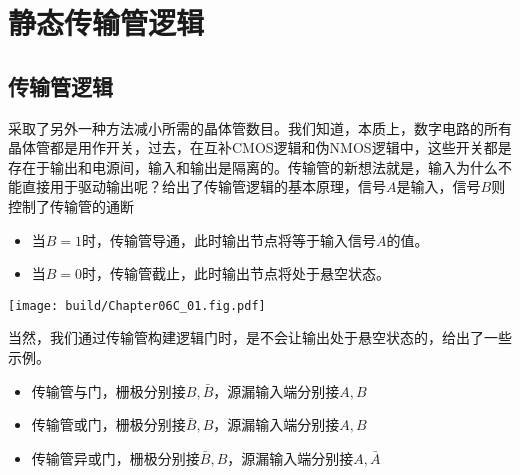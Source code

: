 \section{静态传输管逻辑}

\subsection{传输管逻辑}
采取了另外一种方法减小所需的晶体管数目。我们知道，本质上，数字电路的所有晶体管都是用作开关，过去，在互补CMOS逻辑和伪NMOS逻辑中，这些开关都是存在于输出和电源间，输入和输出是隔离的。传输管的新想法就是，输入为什么不能直接用于驱动输出呢？给出了传输管逻辑的基本原理，信号$A$是输入，信号$B$则控制了传输管的通断
\begin{itemize}
    \item 当$B=1$时，传输管导通，此时输出节点将等于输入信号$A$的值。
    \item 当$B=0$时，传输管截止，此时输出节点将处于悬空状态。
\end{itemize}

\begin{Figure}[传输管的基本原理]
    \texttt{[image: build/Chapter06C\_01.fig.pdf]}
\end{Figure}

当然，我们通过传输管构建逻辑门时，是不会让输出处于悬空状态的，给出了一些示例。
\begin{itemize}
    \item 传输管与门\hphantom{门}，栅极分别接$B,\bar{B}$，源漏输入端分别接$A,B$
    \item 传输管或门\hphantom{门}，栅极分别接$\bar{B},B$，源漏输入端分别接$A,B$
    \item 传输管异或门，栅极分别接$\bar{B},B$，源漏输入端分别接$A,\bar{A}$
\end{itemize}

